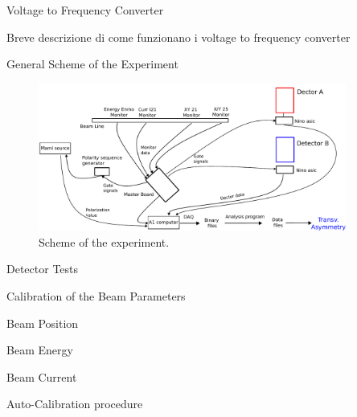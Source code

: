 \documentclass[9pt,a4paper]{beamer}
\begin{document}
\begin{frame}{Voltage to Frequency Converter}

Breve descrizione di come funzionano i voltage to frequency converter

\end{frame}

\begin{frame}{General Scheme of the Experiment}

\begin{figure}[hbtp]
\centering
\includegraphics[width = 0.9\textwidth]{figures/Electronic_scheme.pdf}
\caption{Scheme of the experiment.}
\end{figure}
\end{frame}

\begin{frame}{Detector Tests}

\end{frame}

\begin{frame}{Calibration of the Beam Parameters}

\end{frame}

\begin{frame}{Beam Position}

\end{frame}

\begin{frame}{Beam Energy}

\end{frame}

\begin{frame}{Beam Current}

\end{frame}

\begin{frame}{Auto-Calibration procedure}

\end{frame}
\end{document}
